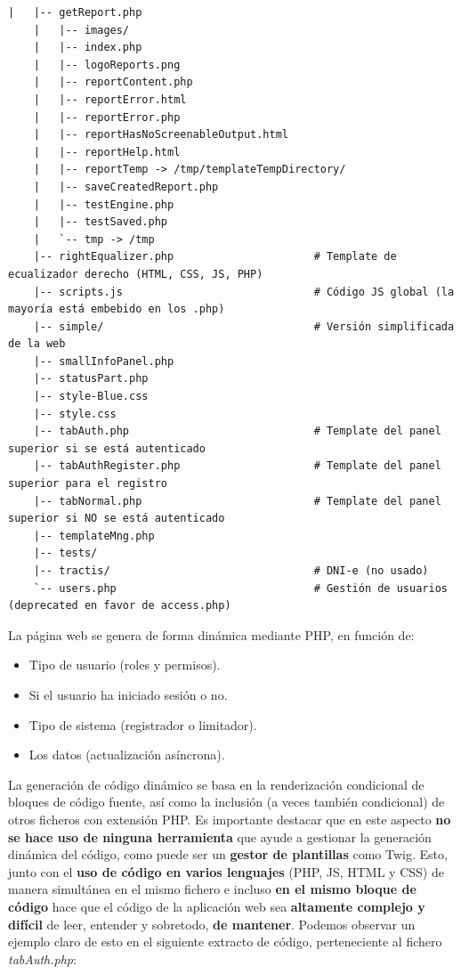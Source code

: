 \begin{lstlisting}[label={lst:lm7-www-treeview}, caption={Estructura de directorios y ficheros de la interfaz web}]
    |   |-- getReport.php
    |   |-- images/
    |   |-- index.php
    |   |-- logoReports.png
    |   |-- reportContent.php
    |   |-- reportError.html
    |   |-- reportError.php
    |   |-- reportHasNoScreenableOutput.html
    |   |-- reportHelp.html
    |   |-- reportTemp -> /tmp/templateTempDirectory/
    |   |-- saveCreatedReport.php
    |   |-- testEngine.php
    |   |-- testSaved.php
    |   `-- tmp -> /tmp
    |-- rightEqualizer.php                      # Template de ecualizador derecho (HTML, CSS, JS, PHP)
    |-- scripts.js                              # Código JS global (la mayoría está embebido en los .php)
    |-- simple/                                 # Versión simplificada de la web
    |-- smallInfoPanel.php
    |-- statusPart.php
    |-- style-Blue.css
    |-- style.css
    |-- tabAuth.php                             # Template del panel superior si se está autenticado
    |-- tabAuthRegister.php                     # Template del panel superior para el registro
    |-- tabNormal.php                           # Template del panel superior si NO se está autenticado
    |-- templateMng.php
    |-- tests/
    |-- tractis/                                # DNI-e (no usado)
    `-- users.php                               # Gestión de usuarios (deprecated en favor de access.php)
\end{lstlisting}

La página web se genera de forma dinámica mediante PHP, en función de:
\begin{itemize}
    \item Tipo de usuario (roles y permisos).
    \item Si el usuario ha iniciado sesión o no.
    \item Tipo de sistema (registrador o limitador).
    \item Los datos (actualización asíncrona).
\end{itemize}

La generación de código dinámico se basa en la renderización condicional de bloques de código fuente, así como la inclusión (a veces también condicional) de otros ficheros con extensión PHP. Es importante destacar que en este aspecto \textbf{no se hace uso de ninguna herramienta} que ayude a gestionar la generación dinámica del código, como puede ser un \textbf{gestor de plantillas} como Twig. Esto, junto con el\textbf{ uso de código en varios lenguajes} (PHP, JS, HTML y CSS) de manera simultánea en el mismo fichero e incluso \textbf{en el mismo bloque de código} hace que el código de la aplicación web sea \textbf{altamente complejo y difícil} de leer, entender y sobretodo, \textbf{de mantener}. Podemos observar un ejemplo claro de esto en el siguiente extracto de código, perteneciente al fichero \textit{tabAuth.php}:\newline

